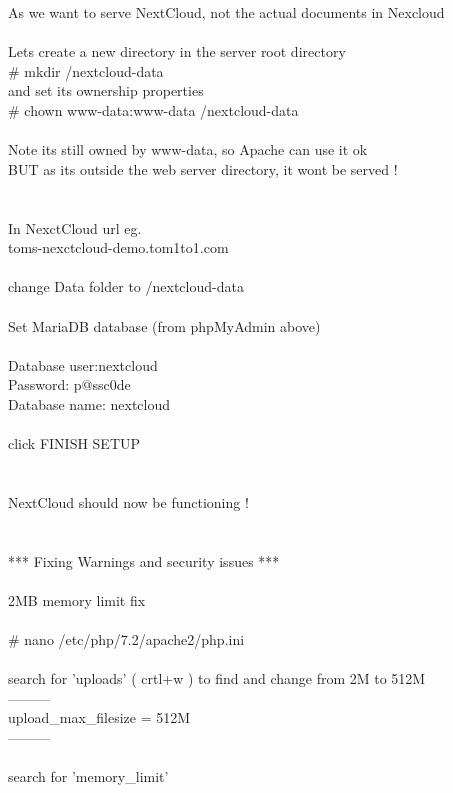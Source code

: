 \documentclass[10pt,a4paper]{article}
\begin{document}
{	As we want to serve NextCloud, not the actual documents in Nexcloud\\
\\
	Lets create a new directory in the server root directory\\
	\# mkdir /nextcloud-data\\
	and set its ownership properties\\
	\# chown www-data:www-data /nextcloud-data \\
\\
	Note its still owned by www-data, so Apache can use it ok\\
	BUT as its outside the web server directory, it wont be served !\\
\\
\\
	In NexctCloud url eg. \\
		toms-nexctcloud-demo.tom1to1.com\\
	\\
	change Data folder to /nextcloud-data\\
\\
	Set MariaDB database (from phpMyAdmin above)\\
		\\
		Database user:nextcloud\\
		Password: p@ssc0de\\
		Database name: nextcloud\\
  \\
	click FINISH SETUP\\
\\
	\\
	NextCloud should now be functioning !\\
\\
\\
*** Fixing Warnings and security issues ***\\
	\\
	2MB memory limit fix\\
\\
		\# nano /etc/php/7.2/apache2/php.ini}{\large \\
\\
		search for 'uploads'  ( crtl+w ) to find and change from 2M to 512M\\
		---------\\
		upload\_max\_filesize = 512M\\
		---------\\
	\\
		search for 'memory\_limit'\\
}
\end{document}
